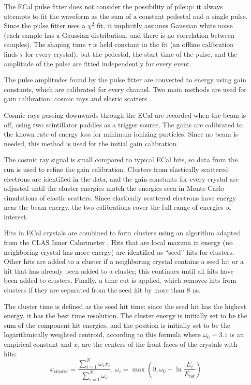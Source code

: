 The ECal pulse fitter does not consider the possibility of pileup: it always attempts to fit the waveform as the sum of a constant pedestal and a single pulse.
Since the pulse fitter uses a $\chi^2$ fit, it implicitly assumes Gaussian white noise (each sample has a Gaussian distribution, and there is no correlation between samples).
The shaping time $\tau$ is held constant in the fit (an offline calibration finds $\tau$ for every crystal), but the pedestal, the start time of the pulse, and the amplitude of the pulse are fitted independently for every event.

The pulse amplitudes found by the pulse fitter are converted to energy using gain constants, which are calibrated for every channel.
Two main methods are used for gain calibration: cosmic rays and elastic scatters \cite{szumila-vance_hps_2016}.

Cosmic rays passing downwards through the ECal are recorded when the beam is off, using two scintillator paddles as a trigger source.
The gains are calibrated to the known rate of energy loss for minimum ionizing particles.
Since no beam is needed, this method is used for the initial gain calibration.

The cosmic ray signal is small compared to typical ECal hits, so data from the run is used to refine the gain calibration.
Clusters from elastically scattered electrons are identified in the data, and the gain constants for every crystal are adjusted until the cluster energies match the energies seen in Monte Carlo simulations of elastic scatters.
Since elastically scattered electrons have energy near the beam energy, the two calibrations cover the full range of energies of interest.

Hits in ECal crystals are combined to form clusters using an algorithm adapted from the CLAS Inner Calorimeter \cite{niyazov_dvcs_2005}.
Hits that are local maxima in energy (no neighboring crystal has more energy) are identified as ``seed'' hits for clusters.
Other hits are added to a cluster if a neighboring crystal contains a seed hit or a hit that has already been added to a cluster; this continues until all hits have been added to clusters.
Finally, a time cut is applied, which removes hits from clusters if they are separated from the seed hit by more than 8 ns.

The cluster time is defined as the seed hit time: since the seed hit has the highest energy, it has the best time resolution.
The cluster energy is initially set to be the sum of the component hit energies, and the position is initially set to be the logarithmically weighted centroid, according to this formula where $\omega_0=3.1$ is an empirical constant and $x_i$ are the centers of the front faces of the crystals with hits:
\begin{equation}
    x_{cluster} = \frac{\sum_{i=1}^{N} \omega_i x_i}{\sum_{i=1}^{N} \omega_i},\, \omega_i = \max\left(0,\omega_0+\ln\frac{E_i}{E_{tot}}\right)
\end{equation}

